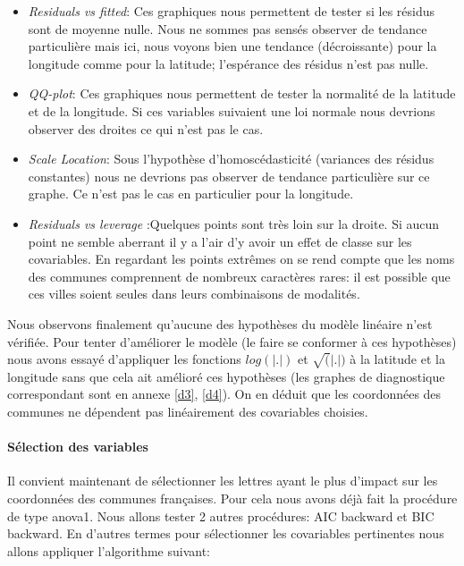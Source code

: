 \documentclass[french]{article}%
\begin{document}
		\begin{itemize}
		
			\item\textit{Residuals vs fitted}: Ces graphiques nous permettent de tester si les résidus sont de moyenne nulle. Nous ne sommes pas sensés observer de tendance particulière mais ici, nous voyons bien une tendance (décroissante) pour la longitude comme pour la latitude; l’espérance des résidus n’est pas nulle.
			
			\item \textit{QQ-plot}: Ces graphiques nous permettent de tester la normalité de la latitude et de la longitude. Si ces variables suivaient une loi normale nous devrions observer des droites ce qui n'est pas le cas.
			
			\item \textit{Scale Location}: Sous l'hypothèse d'homoscédasticité (variances des résidus constantes) nous ne devrions pas observer de tendance particulière sur ce graphe. Ce n'est pas le cas en particulier pour la longitude.
			
			\item \textit{Residuals vs leverage} :Quelques points sont très loin sur la droite. Si aucun point ne semble aberrant il y a l’air d’y avoir un effet de classe sur les covariables. En regardant les points extrêmes on se rend compte que les noms des communes comprennent de nombreux caractères rares: il est possible que ces villes soient seules dans leurs combinaisons de modalités.
			
		\end{itemize}
	
		Nous observons finalement qu'aucune des hypothèses du modèle linéaire n'est vérifiée. Pour tenter d'améliorer le modèle (le faire se conformer à ces hypothèses) nous avons essayé d'appliquer les fonctions $log(|.|)$ et $\sqrt(|.|)$ à la latitude et la longitude sans que cela ait amélioré ces hypothèses (les graphes de diagnostique correspondant sont en annexe \autoref{d3}, \autoref{d4}). On en déduit que les coordonnées des communes ne dépendent pas linéairement des covariables choisies.
	
	\paragraph*{Sélection des variables}
		
		Il convient maintenant de sélectionner les lettres ayant le plus d'impact sur les coordonnées des communes françaises. Pour cela nous avons déjà fait la procédure de type anova1. Nous allons tester 2 autres procédures: AIC backward et BIC backward. En d'autres termes pour sélectionner les covariables pertinentes nous allons appliquer l'algorithme suivant:
		
\end{document}
